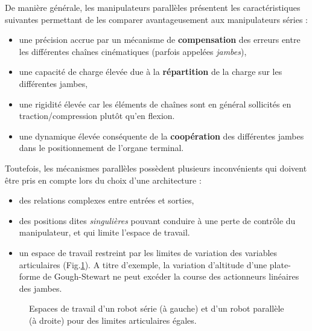 De manière générale, les manipulateurs parallèles présentent les 
caractéristi\-ques sui\-vantes permettant de les comparer avantageusement aux 
manipulateurs séries :
\begin{itemize}
 \item une précision accrue par un mécanisme de {\bf compensation} des erreurs 
entre les différentes chaînes cinématiques (parfois appelées {\it jambes}),
 \item une capacité de charge élevée due à la {\bf répartition} de la charge 
sur les différentes jambes,
 \item une rigidité élevée car les éléments de chaînes sont en 
g\'en\'eral sollicités en traction/compression plutôt qu'en flexion.
 \item une dynamique élevée conséquente de la {\bf coopération} des différentes 
jam\-bes dans le positionnement de l'organe terminal.
\end{itemize}

Toutefois, les mécanismes parallèles possèdent plusieurs inconvénients qui 
doivent être pris en compte lors du choix d'une architecture :
\begin{itemize}
 \item des relations complexes entre entrées et sorties,
 \item des positions dites {\it singulières} pouvant conduire à une perte de 
contrôle du manipulateur, et qui limite l'espace de travail.
 \item un espace de travail restreint par les limites de variation des 
variables articulaires (Fig.\ref{intro:fig3b}). A titre d'exemple, la variation 
d'altitude d'une plate-forme de Gough-Stewart ne peut excéder la course des 
actionneurs linéaires des jambes.
\end{itemize}

\begin{figure}[!ht]
  \centering
\hfill
    \caption{\footnotesize{Espaces de travail d'un robot série (\`a gauche) et 
d'un robot parall\`ele (\`a droite) pour des limites articulaires \'egales.}}
\label{intro:fig3b}
\end{figure}

